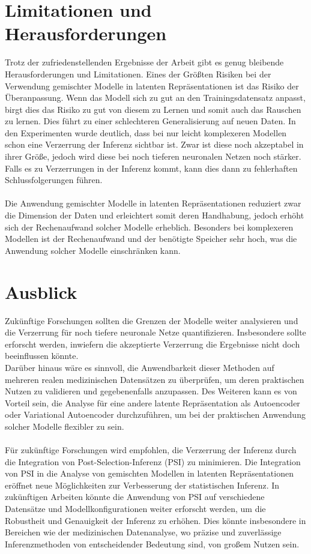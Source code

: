 \documentclass[%
thesis=student,%
coverpage=false,%
titlepage=false,%
headmarks=true, %
german,%
font=libertine, %
math=newpxtx, %
BCOR=5mm,%
coverBCOR=11mm%
]{tumbook}
\theoremstyle{break}
\begin{document}
\section{Limitationen und Herausforderungen}
Trotz der zufriedenstellenden Ergebnisse der Arbeit gibt es genug bleibende Herausforderungen und Limitationen. Eines der Größten Risiken bei der Verwendung gemischter Modelle in latenten Repräsentationen ist das Risiko der Überanpassung. Wenn das Modell sich zu gut an den Trainingsdatensatz anpasst, birgt dies das Risiko zu gut von diesem zu Lernen und somit auch das Rauschen zu lernen. Dies führt zu einer schlechteren Generalisierung auf neuen Daten. In den Experimenten wurde deutlich, dass bei nur leicht komplexeren Modellen schon eine Verzerrung der Inferenz sichtbar ist. Zwar ist diese noch akzeptabel in ihrer Größe, jedoch wird diese bei noch tieferen neuronalen Netzen noch stärker. Falls es zu Verzerrungen in der Inferenz kommt, kann dies dann zu fehlerhaften Schlussfolgerungen führen. \\
\\
Die Anwendung gemischter Modelle in latenten Repräsentationen reduziert zwar die Dimension der Daten und erleichtert somit deren Handhabung, jedoch erhöht sich der Rechenaufwand solcher Modelle erheblich. Besonders bei komplexeren Modellen ist der Rechenaufwand und der benötigte Speicher sehr hoch, was die Anwendung solcher Modelle einschränken kann. 

\section{Ausblick}
Zukünftige Forschungen sollten die Grenzen der Modelle weiter analysieren und die Verzerrung für noch tiefere neuronale Netze quantifizieren. Insbesondere sollte erforscht werden, inwiefern die akzeptierte Verzerrung die Ergebnisse nicht doch beeinflussen könnte.\\
Darüber hinaus wäre es sinnvoll, die Anwendbarkeit dieser Methoden auf mehreren realen medizinischen Datensätzen zu überprüfen, um deren praktischen Nutzen zu validieren und gegebenenfalls anzupassen. Des Weiteren kann es von Vorteil sein, die Analyse für eine andere latente Repräsentation als Autoencoder oder Variational Autoencoder durchzuführen, um bei der praktischen Anwendung solcher Modelle flexibler zu sein.\\
\\
Für zukünftige Forschungen wird empfohlen, die Verzerrung der Inferenz durch die Integration von Post-Selection-Inferenz (PSI) zu minimieren. Die Integration von PSI in die Analyse von gemischten Modellen in latenten Repräsentationen eröffnet neue Möglichkeiten zur Verbesserung der statistischen Inferenz. In zukünftigen Arbeiten könnte die Anwendung von PSI auf verschiedene Datensätze und Modellkonfigurationen weiter erforscht werden, um die Robustheit und Genauigkeit der Inferenz zu erhöhen. Dies könnte insbesondere in Bereichen wie der medizinischen Datenanalyse, wo präzise und zuverlässige Inferenzmethoden von entscheidender Bedeutung sind, von großem Nutzen sein.
\\
\backmatter{}
\end{document}
